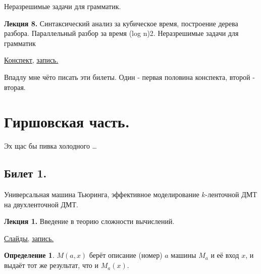 \documentclass[a4paper]{article}
\newcommand{\mybox}{%
    \collectbox{%
        \setlength{\fboxsep}{1pt}%
        \fbox{\BOXCONTENT}%
    }%
}
\theoremstyle{indented}
\theoremstyle{definition}
\newtheorem{defn}{Определение}
\theoremstyle{remark}
\begin{document}
Неразрешимые задачи для грамматик.

\hrulefill

\textbf{Лекция 8.} Синтаксический анализ за кубическое время, построение дерева разбора. Параллельный разбор за время (log n)2. Неразрешимые задачи для грамматик

\begin{flushright}
    \mybox{
        \href{https://users.math-cs.spbu.ru/~okhotin/teaching/tcs_fl_2021/okhotin_tcs_fl_2021_l8.pdf}{Конспект,}
        \href{https://disk.yandex.ru/d/knoQ44wLmGDwwQ/2021-2022%20учебный%20год%20(осенний%20семестр)/2%20курс/Теоретическая%20информатика/M2021-10-20_111602_1m_102.mp4}{запись.}
    }
\end{flushright}

Впадлу мне чёто писать эти билеты. Один - первая половина конспекта, второй - вторая.





\section{Гиршовская часть.} 

Эх щас бы пивка холодного \ldots 



\newpage 

\subsection{Билет 1.}

Универсальная машина Тьюринга, эффективное моделирование $k$-ленточной ДМТ на двухленточной ДМТ. 

\hrulefill

\textbf{Лекция 1.} Введение в теорию сложности вычислений.

\begin{flushright}
    \mybox{
        \href{https://drive.google.com/file/d/1cErhF8-5Pa9wFzmlXf9YcYOunX7_Khty/view?usp=sharing}{Слайды,}
        \href{https://disk.yandex.ru/d/knoQ44wLmGDwwQ/2021-2022%20учебный%20год%20(осенний%20семестр)/2%20курс/Теоретическая%20информатика/M2021-10-27_111615_1h35m_102.mp4}{запись.}
    }
\end{flushright}

\begin{defn}
     $M(a, x)$ берёт описание (номер) $a$ машины $M_a$ и её вход $x$, и выдаёт тот же результат, что и $M_a(x)$.
\end{defn}
\end{document}
